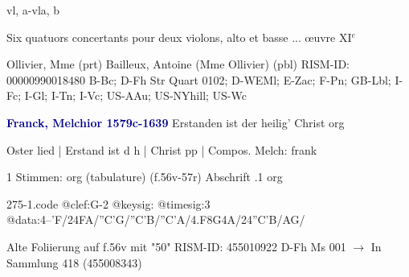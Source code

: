 \documentclass[twocolumn]{book}
\begin{document}
 vl, a-vla, b
\newline \begin{itshape}Six quatuors concertants pour deux violons, alto et basse ... œuvre XI$^e$\end{itshape} 
\newline Ollivier, Mme  (prt)
\newline Bailleux, Antoine (Mme Ollivier)  (pbl)
\newline RISM-ID: 00000990018480
\newline B-Bc; D-Fh  Str Quart 0102; D-WEMl; E-Zac; F-Pn; GB-Lbl; I-Fc; I-Gl; I-Tn; I-Vc; US-AAu; US-NYhill; US-Wc
\newline \par \vspace{7pt} \textcolor{darkblue}{\textbf{Franck, Melchior  1579c-1639}}
\newline Erstanden ist der heilig' Christ
\newline org
\newline \begin{itshape}[f.56v, at left:] Oster lied | Erstand ist d h | Christ pp | Compos. Melch: frank\end{itshape} 
\newline \textcolor{darkblue}{}  1 Stimmen: org (tabulature)  (f.56v-57r)
\newline Abschrift
.1  org  
\begin{filecontents*}{275-1.code}
@clef:G-2
@keysig:
@timesig:3
@data:4--'F/24FA/''C'G/''C'B/''C'A/4.F8G4A/24''C'B/AG/
\end{filecontents*}
\newline
%
\newline Alte Foliierung auf f.56v mit "50"
\newline RISM-ID: 455010922
\newline D-Fh  Ms 001
\newline $\rightarrow$ In Sammlung 418 (455008343)
      
\end{document}
